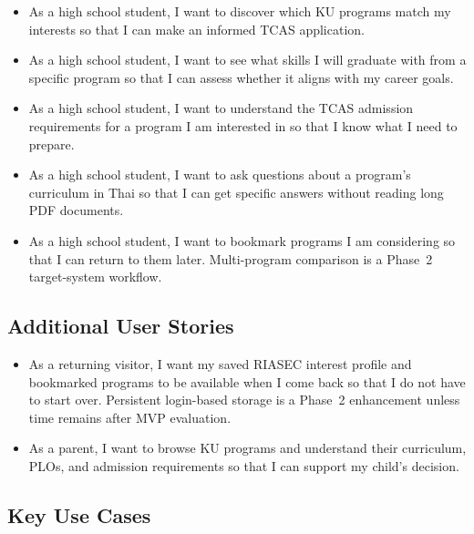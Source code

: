 \begin{itemize}[leftmargin=80pt]
    \item As a high school student, I want to discover which KU programs match my interests so that I can make an informed TCAS application.

    \item As a high school student, I want to see what skills I will graduate with from a specific program so that I can assess whether it aligns with my career goals.

    \item As a high school student, I want to understand the TCAS admission requirements for a program I am interested in so that I know what I need to prepare.

    \item As a high school student, I want to ask questions about a program's curriculum in Thai so that I can get specific answers without reading long PDF documents.

    \item As a high school student, I want to bookmark programs I am considering so that I can return to them later. Multi-program comparison is a Phase~2 target-system workflow.
\end{itemize}

\subsection{Additional User Stories}
\label{subsection:additional-user-stories}

\begin{itemize}[leftmargin=80pt]
    \item As a returning visitor, I want my saved RIASEC interest profile and bookmarked programs to be available when I come back so that I do not have to start over. Persistent login-based storage is a Phase~2 enhancement unless time remains after MVP evaluation.

    \item As a parent, I want to browse KU programs and understand their curriculum, PLOs, and admission requirements so that I can support my child's decision.
\end{itemize}

\subsection{Key Use Cases}
\label{subsection:key-use-cases}

